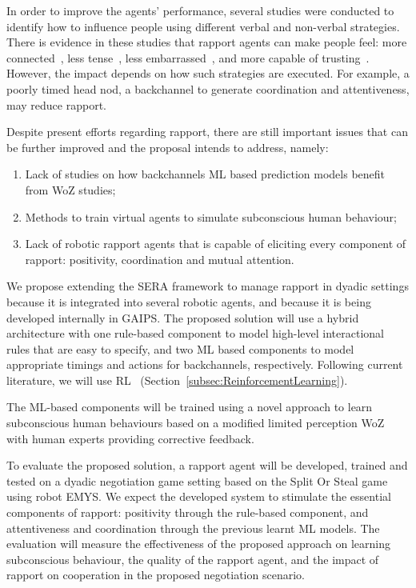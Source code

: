 In order to improve the agents' performance, several studies were conducted to identify how to influence people using different verbal and non-verbal strategies. There is evidence in these studies that rapport agents can make people feel: more connected~\cite{Rosenthal-vonderPutten2013, Tsai2012}, less tense~\cite{Wang2010}, less embarrassed~\cite{Kang2009}, and more capable of trusting~\cite{Kang2009}. However, the impact depends on how such strategies are executed. For example, a poorly timed head nod, a backchannel to generate coordination and attentiveness, may reduce rapport.

Despite present efforts regarding rapport, there are still important issues that can be further improved and the proposal intends to address, namely:
\begin{enumerate}[label=(\roman*)]
	\item Lack of studies on how backchannels \ac{ML} based prediction models benefit from \ac{WoZ} studies;
	\item Methods to train virtual agents to simulate subconscious human behaviour;
	\item Lack of robotic rapport agents that is capable of eliciting every component of rapport: positivity, coordination and mutual attention.
\end{enumerate}

We propose extending the \ac{SERA}\cite{Tullio2015} framework to manage rapport in dyadic settings because it is integrated into several robotic agents, and because it is being developed internally in \ac{GAIPS}. The proposed solution will use a hybrid architecture with one rule-based component to model high-level interactional rules that are easy to specify, and two \ac{ML} based components to model appropriate timings and actions for backchannels, respectively. Following current literature, we will use \ac{RL}~\cite{Thomaz2006, Kok2012, Zhao2014, Papangelis2014, Blumberg2002, Andrist2015, Mutlu2006} (Section~\ref{subsec:ReinforcementLearning}).

The \ac{ML}-based components will be trained using a novel approach to learn subconscious human behaviours based on a modified limited perception \ac{WoZ}~\cite{Sequeira2016, Knox2014} with human experts providing corrective feedback.

To evaluate the proposed solution, a rapport agent will be developed, trained and tested on a dyadic negotiation game setting based on the Split Or Steal game using robot \ac{EMYS}. We expect the developed system to stimulate the essential components of rapport: positivity through the rule-based component, and attentiveness and coordination through the previous learnt \ac{ML} models. The evaluation will measure the effectiveness of the proposed approach on learning subconscious behaviour, the quality of the rapport agent, and the impact of rapport on cooperation in the proposed negotiation scenario.

